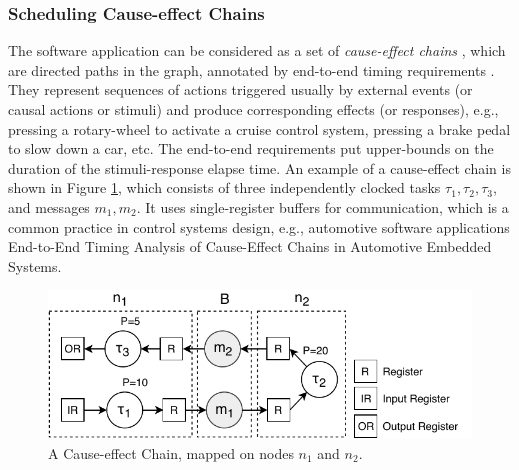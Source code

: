 \subsubsection{Scheduling Cause-effect Chains}\label{subsec_causeeffectchains}
The software application can be considered as a set of \textit{cause-effect chains} \sexpsp{\Gamma}{\Gamma}, which are  directed paths in the graph, annotated by end-to-end timing requirements . They represent sequences of actions triggered usually by external events (or causal actions or stimuli) and produce corresponding effects (or responses), e.g.,  pressing a rotary-wheel to activate a cruise control system, pressing a brake pedal to slow down a car, etc. The end-to-end requirements put upper-bounds on the duration of the stimuli-response elapse time. An example of a cause-effect chain is shown in Figure \ref{fig_causeeffectchainntk}, which consists of three independently clocked tasks $\tau_1,\tau_2,\tau_3$, and messages $m_1,m_2$. It uses single-register buffers for communication, which is a common practice in control systems design, e.g., automotive software applications
End-to-End Timing Analysis of Cause-Effect Chains in Automotive Embedded Systems.
\begin{figure}
	\centering
	\includegraphics[width=0.7\linewidth]{img/cause_effect_chain_ntk}
	\caption{A Cause-effect Chain, mapped on nodes $n_1$ and $n_2$.}
	\label{fig_causeeffectchainntk}
\end{figure}

